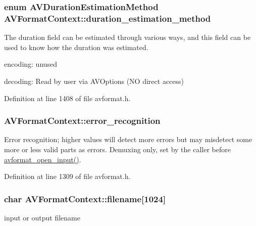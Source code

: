 \subsubsection[{\texorpdfstring{duration\+\_\+estimation\+\_\+method}{duration_estimation_method}}]{\setlength{\rightskip}{0pt plus 5cm}enum {\bf A\+V\+Duration\+Estimation\+Method} A\+V\+Format\+Context\+::duration\+\_\+estimation\+\_\+method}\hypertarget{struct_a_v_format_context_a95035552afae17c1b7cd701ad72e67b5}{}\label{struct_a_v_format_context_a95035552afae17c1b7cd701ad72e67b5}
The duration field can be estimated through various ways, and this field can be used to know how the duration was estimated.
\begin{DoxyItemize}
\item encoding\+: unused
\item decoding\+: Read by user via A\+V\+Options (NO direct access) 
\end{DoxyItemize}

Definition at line 1408 of file avformat.\+h.

\subsubsection[{\texorpdfstring{error\+\_\+recognition}{error_recognition}}]{ A\+V\+Format\+Context\+::error\+\_\+recognition}\hypertarget{struct_a_v_format_context_aeebb15a72d1503e641b633aeb3be0bf0}{}\label{struct_a_v_format_context_aeebb15a72d1503e641b633aeb3be0bf0}
Error recognition; higher values will detect more errors but may misdetect some more or less valid parts as errors. Demuxing only, set by the caller before \hyperlink{group__lavf__decoding_ga10a404346c646e4ab58f4ed798baca32}{avformat\+\_\+open\+\_\+input()}. 

Definition at line 1309 of file avformat.\+h.

\subsubsection[{\texorpdfstring{filename}{filename}}]{\setlength{\rightskip}{0pt plus 5cm}char A\+V\+Format\+Context\+::filename\mbox{[}1024\mbox{]}}\hypertarget{struct_a_v_format_context_a65a978cf0ca3c0f0da52840d2e97f9ea}{}\label{struct_a_v_format_context_a65a978cf0ca3c0f0da52840d2e97f9ea}
input or output filename


